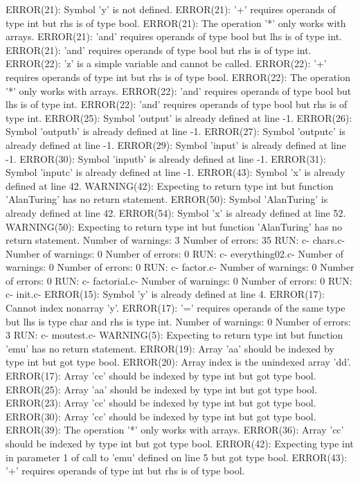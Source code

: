 \documentclass[12pt]{book}
\begin{document}
ERROR(21): Symbol 'y' is not defined.
ERROR(21): '+' requires operands of type int but rhs is of type bool.
ERROR(21): The operation '*' only works with arrays.
ERROR(21): 'and' requires operands of type bool but lhs is of type int.
ERROR(21): 'and' requires operands of type bool but rhs is of type int.
ERROR(22): 'z' is a simple variable and cannot be called.
ERROR(22): '+' requires operands of type int but rhs is of type bool.
ERROR(22): The operation '*' only works with arrays.
ERROR(22): 'and' requires operands of type bool but lhs is of type int.
ERROR(22): 'and' requires operands of type bool but rhs is of type int.
ERROR(25): Symbol 'output' is already defined at line -1.
ERROR(26): Symbol 'outputb' is already defined at line -1.
ERROR(27): Symbol 'outputc' is already defined at line -1.
ERROR(29): Symbol 'input' is already defined at line -1.
ERROR(30): Symbol 'inputb' is already defined at line -1.
ERROR(31): Symbol 'inputc' is already defined at line -1.
ERROR(43): Symbol 'x' is already defined at line 42.
WARNING(42): Expecting to return type int but function 'AlanTuring' has no return statement.
ERROR(50): Symbol 'AlanTuring' is already defined at line 42.
ERROR(54): Symbol 'x' is already defined at line 52.
WARNING(50): Expecting to return type int but function 'AlanTuring' has no return statement.
Number of warnings: 3
Number of errors: 35
RUN: c- chars.c-
Number of warnings: 0
Number of errors: 0
RUN: c- everything02.c-
Number of warnings: 0
Number of errors: 0
RUN: c- factor.c-
Number of warnings: 0
Number of errors: 0
RUN: c- factorial.c-
Number of warnings: 0
Number of errors: 0
RUN: c- init.c-
ERROR(15): Symbol 'y' is already defined at line 4.
ERROR(17): Cannot index nonarray 'y'.
ERROR(17): '=' requires operands of the same type but lhs is type char and rhs is type int.
Number of warnings: 0
Number of errors: 3
RUN: c- moutest.c-
WARNING(5): Expecting to return type int but function 'emu' has no return statement.
ERROR(19): Array 'aa' should be indexed by type int but got type bool.
ERROR(20): Array index is the unindexed array 'dd'.
ERROR(17): Array 'cc' should be indexed by type int but got type bool.
ERROR(25): Array 'aa' should be indexed by type int but got type bool.
ERROR(23): Array 'cc' should be indexed by type int but got type bool.
ERROR(30): Array 'cc' should be indexed by type int but got type bool.
ERROR(39): The operation '*' only works with arrays.
ERROR(36): Array 'cc' should be indexed by type int but got type bool.
ERROR(42): Expecting type int in parameter 1 of call to 'emu' defined on line 5 but got type bool.
ERROR(43): '+' requires operands of type int but rhs is of type bool.
\end{document}
